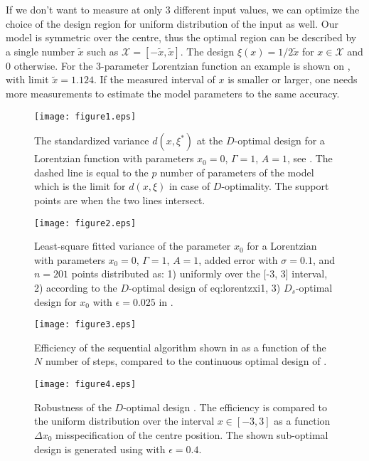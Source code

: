 \documentclass[12pt]{iopart}
\begin{document}
If we don't want to measure at only 3 different input values, we can optimize the choice of the design region for uniform distribution of the input as well. Our model is symmetric over the centre, thus the optimal region can be described by a single number $\tilde x$ such as $\mathcal{X} = [-\tilde x, \tilde x]$. The design $\xi(x) = 1/{2 \tilde x}$ for $x \in \mathcal{X}$ and $0$ otherwise. For the 3-parameter Lorentzian function an example is shown on , with limit $\tilde x = 1.124$. If the measured interval of $x$ is smaller or larger, one needs more measurements to estimate the model parameters to the same accuracy.

\begin{figure}
\texttt{[image: figure1.eps]}
\caption{The standardized variance $d(x, \xi^*)$ at the $D$-optimal design for a Lorentzian function with parameters $x_0=0$, $\Gamma = 1$, $A = 1$, see . The dashed line is equal to the $p$ number of parameters of the model which is the limit for $d(x, \xi)$ in case of $D$-optimality. The support points are when the two lines intersect.}
\label{fig:lorentz3d}
\end{figure}

\begin{figure}
\texttt{[image: figure2.eps]}
\caption{Least-square fitted variance of the parameter $x_0$ for a Lorentzian with parameters $x_0=0$, $\Gamma = 1$, $A = 1$, added error with $\sigma=0.1$, and $n=201$ points distributed as: 1) uniformly over the [-3, 3] interval, 2) according to the $D$-optimal design of {eq:lorentzxi1}, 3) $D_s$-optimal design for $x_0$ with $\epsilon = 0.025$ in .}
\label{fig:simvariance}
\end{figure}

\begin{figure}
\texttt{[image: figure3.eps]}
\caption{Efficiency of the sequential algorithm shown in  as a function of the $N$ number of steps, compared to the continuous optimal design of .}
\label{fig:xinefficiency}
\end{figure}

\begin{figure}
\texttt{[image: figure4.eps]}
\caption{Robustness of the $D$-optimal design . The efficiency is compared to the uniform distribution over the interval $x\in [-3,3]$ as a function $\Delta x_0$ misspecification of the centre position. The shown sub-optimal design is generated using  with $\epsilon = 0.4$.}
\label{fig:x0robust}
\end{figure}
\end{document}
